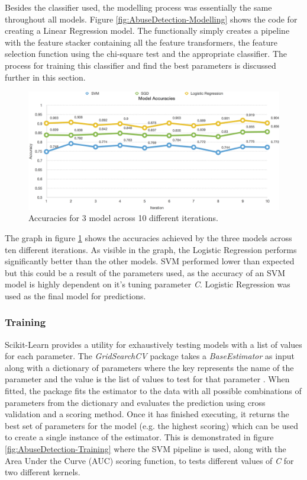 Besides the classifier used, the modelling process was essentially the same throughout all models. Figure \ref{fig:AbuseDetection-Modelling} shows the code for creating a Linear Regression model. The functionally simply creates a pipeline with the feature stacker containing all the feature transformers, the feature selection function using the chi-square test and the appropriate classifier. The process for training this classifier and find the best parameters is discussed further in this section.

\begin{figure}[H]
	\centering
	\includegraphics[width=\textwidth]{Images/Implementation/DataProcessing/AbuseDetection/ModelAccuracies}
	\caption{Accuracies for 3 model across 10 different iterations.}
	\label{fig:AbuseDetection-ModelAccuracies}
\end{figure}

The graph in figure \ref{fig:AbuseDetection-ModelAccuracies} shows the accuracies achieved by the three models across ten different iterations. As visible in the graph, the Logistic Regression performs significantly better than the other models. SVM performed lower than expected but this could be a result of the parameters used, as the accuracy of an SVM model is highly dependent on it's tuning parameter \textit{C}. Logistic Regression was used as the final model for predictions.

\subsubsection{Training}
Scikit-Learn provides a utility for exhaustively testing models with a list of values for each parameter. The \textit{GridSearchCV} package takes a \textit{BaseEstimator} as input along with a dictionary of parameters where the key represents the name of the parameter and the value is the list of values to test for that parameter \cite{Scikit:GridSearch}. When fitted, the package fits the estimator to the data with all possible combinations of parameters from the dictionary and evaluates the prediction using cross validation and a scoring method. Once it has finished executing, it returns the best set of parameters for the model (e.g. the highest scoring) which can be used to create a single instance of the estimator. This is demonstrated in figure \ref{fig:AbuseDetection-Training} where the SVM pipeline is used, along with the Area Under the Curve (AUC) scoring function, to tests different values of \textit{C} for two different kernels.

